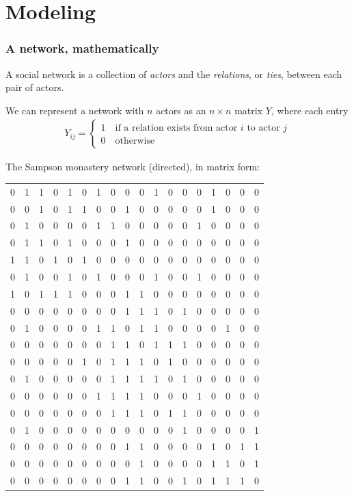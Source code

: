 \documentclass[slidestop,compress, 10pt]{beamer}
\begin{document}
\section{Modeling}
\frame
{
\frametitle{A network, mathematically}
A social network is a collection of \emph{actors} and the \emph{relations}, or \emph{ties}, between each pair of actors.  

We can represent a network with $n$ actors as an $n \times n$ matrix $Y$, where each entry
\begin{align*}
	Y_{ij} =
	\begin{cases} 	1 \quad \text{if a relation exists from actor $i$ to actor $j$}\\
					0 \quad \text{otherwise}
	\end{cases}
\end{align*}

The Sampson monastery network (directed), in matrix form:
{\tiny
\begin{table}[ht]
\begin{center}
\begin{tabular}{rrrrrrrrrrrrrrrrrr}
  \hline
0 & 1 & 1 & 0 & 1 & 0 & 1 & 0 & 0 & 0 & 1 & 0 & 0 & 0 & 1 & 0 & 0 & 0 \\ 
0 & 0 & 1 & 0 & 1 & 1 & 0 & 0 & 1 & 0 & 0 & 0 & 0 & 0 & 1 & 0 & 0 & 0 \\ 
0 & 1 & 0 & 0 & 0 & 0 & 1 & 1 & 0 & 0 & 0 & 0 & 0 & 1 & 0 & 0 & 0 & 0 \\ 
0 & 1 & 1 & 0 & 1 & 0 & 0 & 0 & 1 & 0 & 0 & 0 & 0 & 0 & 0 & 0 & 0 & 0 \\ 
1 & 1 & 0 & 1 & 0 & 1 & 0 & 0 & 0 & 0 & 0 & 0 & 0 & 0 & 0 & 0 & 0 & 0 \\ 
0 & 1 & 0 & 0 & 1 & 0 & 1 & 0 & 0 & 0 & 1 & 0 & 0 & 1 & 0 & 0 & 0 & 0 \\ 
1 & 0 & 1 & 1 & 1 & 0 & 0 & 0 & 1 & 1 & 0 & 0 & 0 & 0 & 0 & 0 & 0 & 0 \\ 
0 & 0 & 0 & 0 & 0 & 0 & 0 & 0 & 1 & 1 & 1 & 0 & 1 & 0 & 0 & 0 & 0 & 0 \\ 
0 & 1 & 0 & 0 & 0 & 0 & 1 & 1 & 0 & 1 & 1 & 0 & 0 & 0 & 0 & 1 & 0 & 0 \\ 
0 & 0 & 0 & 0 & 0 & 0 & 0 & 1 & 1 & 0 & 1 & 1 & 1 & 0 & 0 & 0 & 0 & 0 \\ 
0 & 0 & 0 & 0 & 0 & 1 & 0 & 1 & 1 & 1 & 0 & 1 & 0 & 0 & 0 & 0 & 0 & 0 \\ 
0 & 1 & 0 & 0 & 0 & 0 & 0 & 1 & 1 & 1 & 1 & 0 & 1 & 0 & 0 & 0 & 0 & 0 \\ 
0 & 0 & 0 & 0 & 0 & 0 & 1 & 1 & 1 & 1 & 0 & 0 & 0 & 1 & 0 & 0 & 0 & 0 \\ 
0 & 0 & 0 & 0 & 0 & 0 & 0 & 1 & 1 & 1 & 0 & 1 & 1 & 0 & 0 & 0 & 0 & 0 \\ 
0 & 1 & 0 & 0 & 0 & 0 & 0 & 0 & 0 & 0 & 0 & 0 & 1 & 0 & 0 & 0 & 0 & 1 \\ 
0 & 0 & 0 & 0 & 0 & 0 & 0 & 0 & 1 & 1 & 0 & 0 & 0 & 0 & 1 & 0 & 1 & 1 \\ 
0 & 0 & 0 & 0 & 0 & 0 & 0 & 0 & 0 & 1 & 0 & 0 & 0 & 0 & 1 & 1 & 0 & 1 \\ 
0 & 0 & 0 & 0 & 0 & 0 & 0 & 0 & 1 & 1 & 0 & 0 & 1 & 0 & 1 & 1 & 1 & 0 \\ 
   \hline
\end{tabular}
\end{center}
\end{table}}
}
\end{document}
